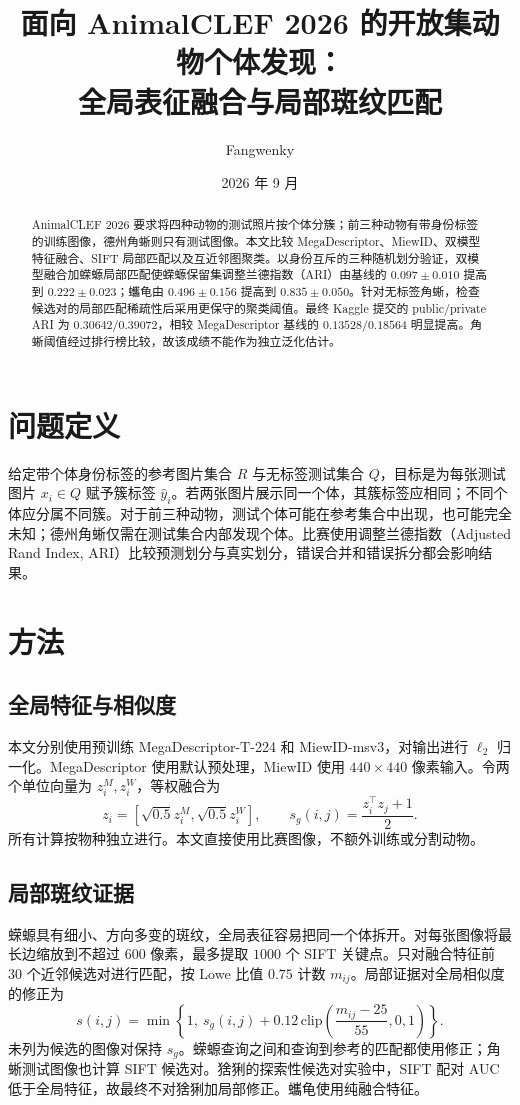 \documentclass[UTF8,a4paper,10pt]{ctexart}
\title{面向 AnimalCLEF 2026 的开放集动物个体发现：\\全局表征融合与局部斑纹匹配}
\author{Fangwenky}
\date{2026 年 9 月}
\begin{document}
\maketitle

\begin{abstract}
AnimalCLEF 2026 要求将四种动物的测试照片按个体分簇；前三种动物有带身份标签的训练图像，德州角蜥则只有测试图像。本文比较 MegaDescriptor、MiewID、双模型特征融合、SIFT 局部匹配以及互近邻图聚类。以身份互斥的三种随机划分验证，双模型融合加蝾螈局部匹配使蝾螈保留集调整兰德指数（ARI）由基线的 $0.097\pm0.010$ 提高到 $0.222\pm0.023$；蠵龟由 $0.496\pm0.156$ 提高到 $0.835\pm0.050$。针对无标签角蜥，检查候选对的局部匹配稀疏性后采用更保守的聚类阈值。最终 Kaggle 提交的 public/private ARI 为 $0.30642/0.39072$，相较 MegaDescriptor 基线的 $0.13528/0.18564$ 明显提高。角蜥阈值经过排行榜比较，故该成绩不能作为独立泛化估计。
\end{abstract}

\section{问题定义}
给定带个体身份标签的参考图片集合 $R$ 与无标签测试集合 $Q$，目标是为每张测试图片 $x_i\in Q$ 赋予簇标签 $\hat y_i$。若两张图片展示同一个体，其簇标签应相同；不同个体应分属不同簇。对于前三种动物，测试个体可能在参考集合中出现，也可能完全未知；德州角蜥仅需在测试集合内部发现个体。比赛使用调整兰德指数（Adjusted Rand Index, ARI）比较预测划分与真实划分，错误合并和错误拆分都会影响结果\cite{competition}。

\section{方法}
\subsection{全局特征与相似度}
本文分别使用预训练 MegaDescriptor-T-224\cite{mega} 和 MiewID-msv3\cite{miewid}，对输出进行 $\ell_2$ 归一化。MegaDescriptor 使用默认预处理，MiewID 使用 $440\times440$ 像素输入。令两个单位向量为 $z_i^M,z_i^W$，等权融合为
\begin{equation}
 z_i=[\sqrt{0.5}z_i^M,\sqrt{0.5}z_i^W],\qquad
 s_g(i,j)=\frac{z_i^\top z_j+1}{2}.
\end{equation}
所有计算按物种独立进行。本文直接使用比赛图像，不额外训练或分割动物。

\subsection{局部斑纹证据}
蝾螈具有细小、方向多变的斑纹，全局表征容易把同一个体拆开。对每张图像将最长边缩放到不超过 $600$ 像素，最多提取 $1000$ 个 SIFT 关键点。只对融合特征前 $30$ 个近邻候选对进行匹配，按 Lowe 比值 $0.75$ 计数 $m_{ij}$\cite{sift}。局部证据对全局相似度的修正为
\begin{equation}
 s(i,j)=\min\left\{1,\ s_g(i,j)+0.12\,\mathrm{clip}\!\left(\frac{m_{ij}-25}{55},0,1\right)\right\}.
\end{equation}
未列为候选的图像对保持 $s_g$。蝾螈查询之间和查询到参考的匹配都使用修正；角蜥测试图像也计算 SIFT 候选对。猞猁的探索性候选对实验中，SIFT 配对 AUC 低于全局特征，故最终不对猞猁加局部修正。蠵龟使用纯融合特征。
\end{document}
